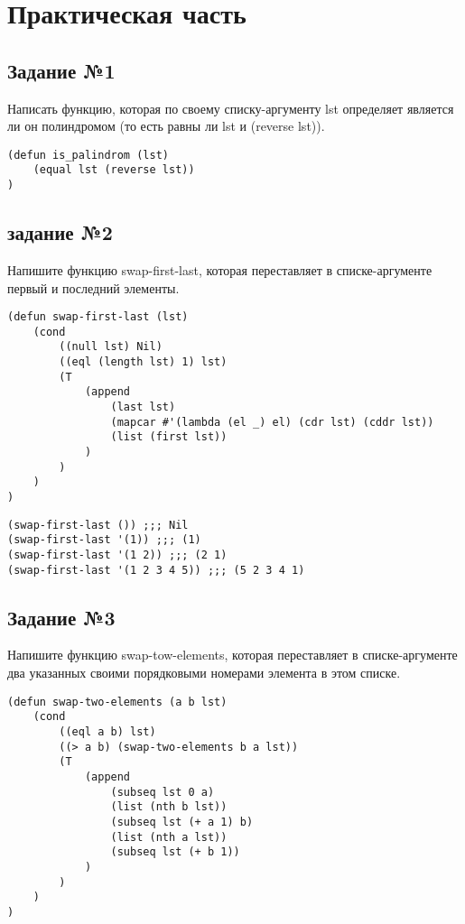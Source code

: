 \chapter{Практическая часть}

\section{Задание №1}

Написать функцию, которая по своему списку-аргументу lst определяет является ли
он полиндромом (то есть равны ли lst и (reverse lst)).

\begin{lstlisting}
(defun is_palindrom (lst)
    (equal lst (reverse lst))
)
\end{lstlisting}

\section{задание №2}

Напишите функцию swap-first-last, которая переставляет в списке-аргументе
первый и последний элементы.

\begin{lstlisting}
(defun swap-first-last (lst)
    (cond
        ((null lst) Nil)
        ((eql (length lst) 1) lst)
        (T
            (append
                (last lst)
                (mapcar #'(lambda (el _) el) (cdr lst) (cddr lst))
                (list (first lst))
            )
        )
    )
)
\end{lstlisting}

\begin{lstlisting}
(swap-first-last ()) ;;; Nil
(swap-first-last '(1)) ;;; (1)
(swap-first-last '(1 2)) ;;; (2 1)
(swap-first-last '(1 2 3 4 5)) ;;; (5 2 3 4 1)
\end{lstlisting}

\section{Задание №3}

Напишите функцию swap-tow-elements, которая переставляет в списке-аргументе
два указанных своими порядковыми номерами элемента в этом списке.

\begin{lstlisting}
(defun swap-two-elements (a b lst)
    (cond
        ((eql a b) lst)
        ((> a b) (swap-two-elements b a lst))
        (T
            (append
                (subseq lst 0 a)
                (list (nth b lst))
                (subseq lst (+ a 1) b)
                (list (nth a lst))
                (subseq lst (+ b 1))
            )
        )
    )
)
\end{lstlisting}

